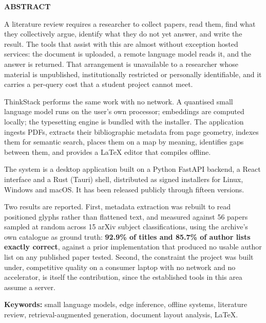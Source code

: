 \documentclass[12pt,a4paper]{report}
\begin{document}
\clearpage

\thispagestyle{empty}
\begin{center}{\Large\bfseries ABSTRACT}\end{center}
\vspace{0.8cm}

A literature review requires a researcher to collect papers, read them, find
what they collectively argue, identify what they do not yet answer, and write
the result. The tools that assist with this are almost without exception hosted
services: the document is uploaded, a remote language model reads it, and the
answer is returned. That arrangement is unavailable to a researcher whose
material is unpublished, institutionally restricted or personally identifiable,
and it carries a per-query cost that a student project cannot meet.

ThinkStack performs the same work with no network. A quantised small language
model runs on the user's own processor; embeddings are computed locally; the
typesetting engine is bundled with the installer. The application ingests PDFs,
extracts their bibliographic metadata from page geometry, indexes them for
semantic search, places them on a map by meaning, identifies gaps between them,
and provides a \LaTeX{} editor that compiles offline.

The system is a desktop application built on a Python FastAPI backend, a React
interface and a Rust (Tauri) shell, distributed as signed installers for Linux,
Windows and macOS. It has been released publicly through fifteen versions.

Two results are reported. First, metadata extraction was rebuilt to read
positioned glyphs rather than flattened text, and measured against 56 papers
sampled at random across 15 arXiv subject classifications, using the archive's
own catalogue as ground truth: \textbf{92.9\% of titles and 85.7\% of author
lists exactly correct}, against a prior implementation that produced no usable
author list on any published paper tested. Second, the constraint the project
was built under, competitive quality on a consumer laptop with no network
and no accelerator, is itself the contribution, since the established tools
in this area assume a server.

\vspace{0.6cm}
\noindent\textbf{Keywords:} small language models, edge inference, offline
systems, literature review, retrieval-augmented generation, document layout
analysis, \LaTeX{}.
\end{document}
